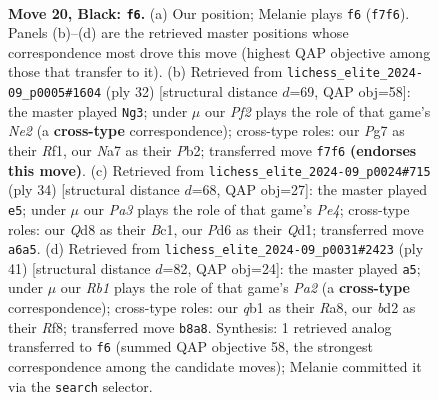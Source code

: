\documentclass[11pt]{article}
\begin{document}
\clearpage

\begin{figure}[p]\centering
\begin{subfigure}{0.46\textwidth}\centering
\resizebox{\linewidth}{!}{%
\newchessgame
\chessboard[
  setfen={1r1q1b2/n1p1rppk/p2p4/1p1Pp2p/1P2P3/P2P1N1P/3BRPP1/RQ3K2 b - - 0 20},
  showmover=false,
  pgfstyle=straightmove, color=movearrow, markmove={f7-f6}
]}
\caption{}
\end{subfigure}\hfill
\begin{subfigure}{0.46\textwidth}\centering
\resizebox{\linewidth}{!}{%
\newchessgame
\chessboard[
  setfen={1r1q1rk1/5pp1/3pbn1p/1pp5/p2pPPP1/P2P3P/1PP1N1BK/R2Q1R2 w - - 1 17},
  showmover=false,
  pgfstyle=straightmove, color=movearrow, markmove={e2-g3}
]}
\caption{}
\end{subfigure}
\\[4pt]
\begin{subfigure}{0.46\textwidth}\centering
\resizebox{\linewidth}{!}{%
\newchessgame
\chessboard[
  setfen={r2qnrk1/5pbp/pp1p2p1/2pP4/P1B1PP2/R6P/1P4P1/2BQR1K1 w - - 0 18},
  showmover=false,
  pgfstyle=straightmove, color=movearrow, markmove={e4-e5}
]}
\caption{}
\end{subfigure}\hfill
\begin{subfigure}{0.46\textwidth}\centering
\resizebox{\linewidth}{!}{%
\newchessgame
\chessboard[
  setfen={r4rk1/p3bn2/2q1p2p/1p1p1pp1/2pP4/P1P1PPB1/1PQN2PP/R3R1K1 b - - 0 21},
  showmover=false,
  pgfstyle=straightmove, color=movearrow, markmove={a7-a5}
]}
\caption{}
\end{subfigure}
\caption{\textbf{Move 20, Black: \texttt{f6}.} (a) Our position; Melanie plays \texttt{f6} (\texttt{f7f6}). Panels (b)--(d) are the retrieved master positions whose correspondence most drove this move (highest QAP objective among those that transfer to it). (b) Retrieved from \texttt{lichess\_elite\_2024-09\_p0005\#1604} (ply 32) [structural distance $d$=69, QAP obj=58]: the master played \texttt{Ng3}; under $\mu$ our \emph{Pf2} plays the role of that game's \emph{Ne2} (a \textbf{cross-type} correspondence); cross-type roles: our \emph{P}g7 as their \emph{R}f1, our \emph{N}a7 as their \emph{P}b2; transferred move \texttt{f7f6} \textbf{(endorses this move)}. (c) Retrieved from \texttt{lichess\_elite\_2024-09\_p0024\#715} (ply 34) [structural distance $d$=68, QAP obj=27]: the master played \texttt{e5}; under $\mu$ our \emph{Pa3} plays the role of that game's \emph{Pe4}; cross-type roles: our \emph{Q}d8 as their \emph{B}c1, our \emph{P}d6 as their \emph{Q}d1; transferred move \texttt{a6a5}. (d) Retrieved from \texttt{lichess\_elite\_2024-09\_p0031\#2423} (ply 41) [structural distance $d$=82, QAP obj=24]: the master played \texttt{a5}; under $\mu$ our \emph{Rb1} plays the role of that game's \emph{Pa2} (a \textbf{cross-type} correspondence); cross-type roles: our \emph{q}b1 as their \emph{R}a8, our \emph{b}d2 as their \emph{R}f8; transferred move \texttt{b8a8}. Synthesis: 1 retrieved analog transferred to \texttt{f6} (summed QAP objective 58, the strongest correspondence among the candidate moves); Melanie committed it via the \texttt{search} selector.}
\label{fig:thought-m39}
\end{figure}
\end{document}
